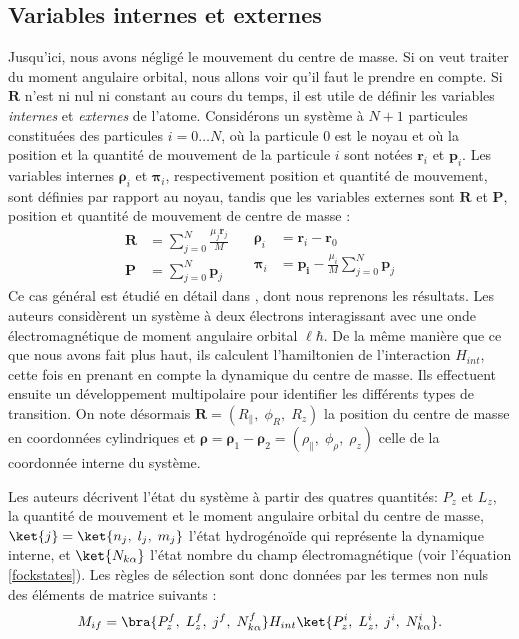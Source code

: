 \subsection{Variables internes et externes}
Jusqu'ici, nous avons négligé le mouvement du centre de masse. Si on veut traiter du moment angulaire orbital, nous allons voir qu'il faut le prendre en compte. Si $\bm{R}$ n'est ni nul ni constant au cours du temps, il est utile de définir les variables \textit{internes} et \textit{externes} de l'atome. Considérons un système à $N+1$ particules constituées des particules $i=0\ldots N$, où la particule $0$ est le noyau et où la position et la quantité de mouvement de la particule $i$ sont notées $\bm{r}_i$ et $\bm{p}_i$. Les variables internes $\bm{\rho}_i$ et $\bm{\pi}_i$, respectivement position et quantité de mouvement, sont définies par rapport au noyau, tandis que les variables externes sont $\bm{R}$ et $\bm{P}$, position et quantité de mouvement de centre de masse :
\begin{equation*}
\begin{split}
\bm{R} &= \sum_{j=0}^N{\frac{\mu_j \bm{r}_j}{M}}\\
\bm{P} &= \sum_{j=0}^N{\bm{p}_j}
\end{split}
\quad
\begin{split}
\bm{\rho}_i&=\bm{r}_i-\bm{r}_0\\
\bm{\pi}_i&=\bm{p_i}-\frac{\mu_i}{M}\sum_{j=0}^N{\bm{p}_j}
\end{split}
\end{equation*}
Ce cas général est étudié en détail dans , dont nous reprenons les résultats. Les auteurs considèrent un système à deux électrons interagissant avec une onde électromagnétique de moment angulaire orbital $\ell\hbar$. De la même manière que ce que nous avons fait plus haut, ils calculent l'hamiltonien de l'interaction $H_{int}$, cette fois en prenant en compte la dynamique du centre de masse. Ils effectuent ensuite un développement multipolaire pour identifier les différents types de transition. On note désormais $\bm{R} = (R_{\parallel},\;\phi_R,\;R_z)$ la position du centre de masse en coordonnées cylindriques et $\bm{\rho} = \bm{\rho}_1-\bm{\rho}_2 = (\rho_{\parallel},\;\phi_{\rho},\;\rho_z)$ celle de la coordonnée interne du système. \par
Les auteurs décrivent l'état du système à partir des quatres quantités: $P_z$ et $L_z$, la quantité de mouvement et le moment angulaire orbital du centre de masse, $\ket{j} = \ket{n_j,\;l_j,\;m_j}$ l'état hydrogénoïde qui représente la dynamique interne, et $\ket{N_{k\alpha}}$ l'état nombre du champ électromagnétique (voir l'équation \ref{fockstates}). Les règles de sélection sont donc données par les termes non nuls des éléments de matrice suivants :
\begin{equation*}
M_{if} = \bra{P^f_z,\;L^f_z,\;j^f,\;N^f_{k\alpha}}H_{int}\ket{P^i_z,\;L^i_z,\;j^i,\;N^i_{k\alpha}}.
\end{equation*}

